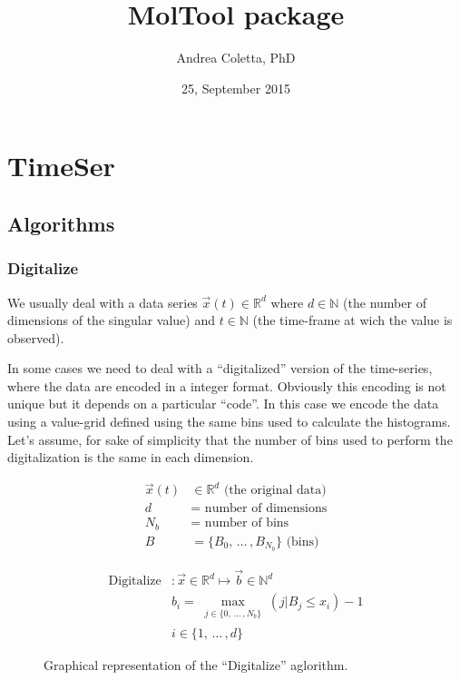 \documentclass[a4paper]{article}
\title{MolTool package}
\author{Andrea Coletta, PhD}
\date{25, September 2015}
\begin{document}
\maketitle
\section{TimeSer}
\subsection{Algorithms}
\subsubsection{Digitalize} \label{sec:digital}
We usually deal with a data series $\vec{x}(t) \in \mathbb{R}^d$ where $d \in \mathbb{N}$ (the number of dimensions of the singular value) and $t \in \mathbb{N}$ (the time-frame at wich the value is observed). 

In some cases we need to deal with a ``digitalized'' version of the time-series, where the data are encoded in a integer format. Obviously this encoding is not unique but it depends on a particular ``code''. In this case we encode the data using a value-grid defined using the same bins used to calculate the histograms. Let's assume, for sake of simplicity that the number of bins used to perform the digitalization is the same in each dimension.

\begin{align*}
 \vec{x}(t) &\in \mathbb{R}^d \text{ (the original data)}\\
 d          &=   \text{ number of dimensions}\\
 {N_b}      &=   \text{ number of bins}\\
 {B}        &=   \{ B_0,\,\dots\, ,B_{{N_b}} \}\text{ (bins)}
\end{align*}

\begin{align*}
 \text{Digitalize} &: \vec{x} \in \mathbb{R}^d \longmapsto \vec{b} \in \mathbb{N}^d \\
 { }               & b_i = \max_{\substack{j \in \{0,\,\dots\,,N_b\} }} (j | B_j \leq x_i) - 1\\ 
 { }               & i \in \{1,\,\dots\,,d\}
\end{align*}

\begin{figure}
    \centering
    \def\svgwidth{0.75\columnwidth}
    
    \caption{Graphical representation of the ``Digitalize'' aglorithm.}
\end{figure}
\end{document}
